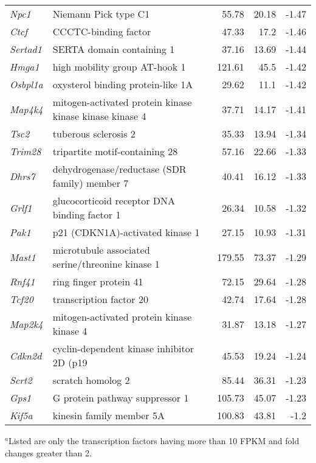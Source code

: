\documentclass{article}
\begin{document}
\begin{table}
\begin{small}
\begin{tabular}{l p{2.5in }rrr}
{\it  Npc1 }& Niemann Pick type C1 &55.78&20.18&-1.47 \\
{\it  Ctcf }& CCCTC-binding factor &47.33&17.2&-1.46 \\
{\it  Sertad1 }& SERTA domain containing 1 &37.16&13.69&-1.44 \\
{\it  Hmga1 }& high mobility group AT-hook 1 &121.61&45.5&-1.42 \\
{\it  Osbpl1a }& oxysterol binding protein-like 1A &29.62&11.1&-1.42 \\
{\it  Map4k4 }& mitogen-activated protein kinase kinase kinase kinase 4 &37.71&14.17&-1.41 \\
{\it  Tsc2 }& tuberous sclerosis 2 &35.33&13.94&-1.34 \\
{\it  Trim28 }& tripartite motif-containing 28 &57.16&22.66&-1.33 \\
{\it  Dhrs7 }& dehydrogenase/reductase (SDR family) member 7 &40.41&16.12&-1.33 \\
{\it  Grlf1 }& glucocorticoid receptor DNA binding factor 1 &26.34&10.58&-1.32 \\
{\it  Pak1 }& p21 (CDKN1A)-activated kinase 1 &27.15&10.93&-1.31 \\
{\it  Mast1 }& microtubule associated serine/threonine kinase 1 &179.55&73.37&-1.29 \\
{\it  Rnf41 }& ring finger protein 41 &72.15&29.64&-1.28 \\
{\it  Tcf20 }& transcription factor 20 &42.74&17.64&-1.28 \\
{\it  Map2k4 }& mitogen-activated protein kinase kinase 4 &31.87&13.18&-1.27 \\
{\it  Cdkn2d }& cyclin-dependent kinase inhibitor 2D (p19 &45.53&19.24&-1.24 \\
{\it  Scrt2 }& scratch homolog 2 &85.44&36.31&-1.23 \\
{\it  Gps1 }& G protein pathway suppressor 1 &105.73&45.07&-1.23 \\
{\it  Kif5a }& kinesin family member 5A &100.83&43.81&-1.2 \\


\hline
\end{tabular}
$^a$Listed are only the transcription factors having more than 10 FPKM and fold changes greater than 2.
\end{small}
\label{tab:TFs}
\end{table}
\end{document}

